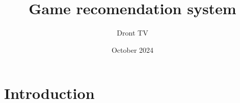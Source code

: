 \documentclass{article}
\title{Game recomendation system}
\author{Dront TV}
\date{October 2024}
\begin{document}
\maketitle

\section{Introduction}
\end{document}
